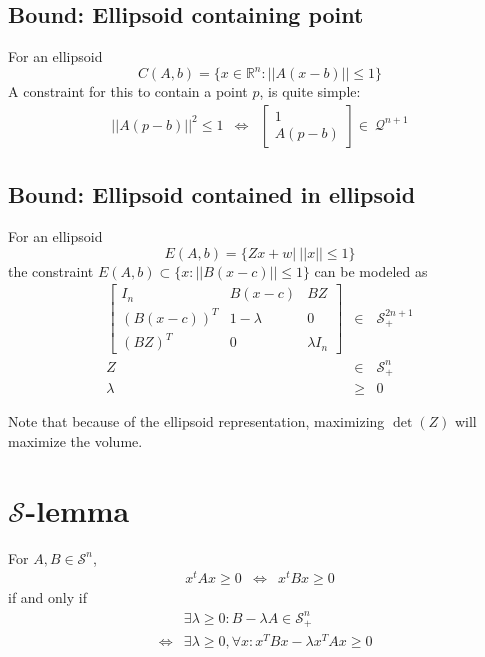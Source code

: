 \documentclass{article}
\begin{document}
\subsection{Bound: Ellipsoid containing point}
For an ellipsoid 
\[
    C(A,b) = \{ x\in\mathbb{R}^n : ||A(x-b)|| \leq 1 \}
\]
A constraint for this to contain a point $p$, is quite simple:
\begin{eqnarray}
    || A(p-b) ||^2 \leq 1 & \Leftrightarrow & \left[ \begin{array}{c} 1 \\ A(p-b) \end{array}\right]\in\ \mathcal{Q}^{n+1}
\end{eqnarray}



\subsection{Bound: Ellipsoid contained in ellipsoid}
For an ellipsoid 
\[
    E(A,b) = \{ Zx+w |\ ||x||\leq 1 \}
\]
the constraint $E(A,b) \subset \{ x: || B(x-c) || \leq 1\}$ can be modeled as 
\begin{eqnarray}
    \left[
        \begin{array}{ccc}
            I_n & B(x-c) & BZ \\
            (B(x-c))^T & 1-\lambda & 0 \\
            (BZ)^T & 0 & \lambda I_n
        \end{array}
    \right] &\in & \mathcal{S}^{2n+1}_+\\
    Z & \in & \mathcal{S}^n_+\\
    \lambda & \geq & 0
\end{eqnarray}

Note that because of the ellipsoid representation, maximizing $\det(Z)$ will
maximize the volume.

\section{$\mathcal{S}$-lemma}

For $A,B\in\mathcal{S}^n$, 
\begin{eqnarray}
    x^tAx\geq 0 & \Leftrightarrow & x^tBx\geq 0
\end{eqnarray}
if and only if
\begin{eqnarray}
    &&\exists \lambda\geq 0: B-\lambda A \in \mathcal{S}^n_+ \\
    &\Leftrightarrow & \exists \lambda\geq 0, \forall x : x^T Bx-\lambda x^TAx \geq 0
\end{eqnarray}
\end{document}
